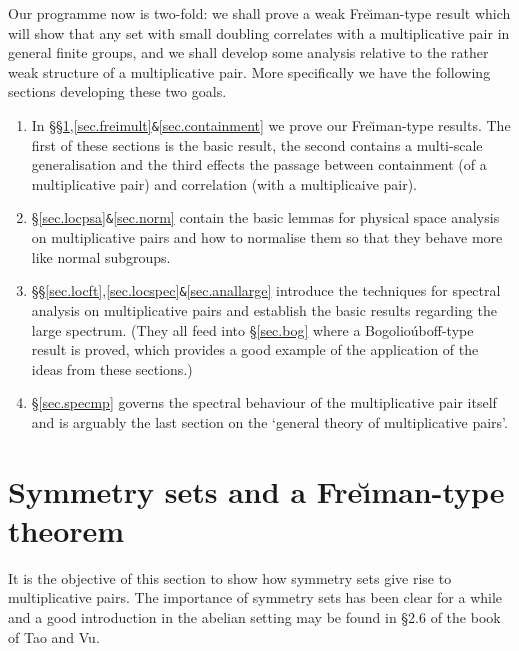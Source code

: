 \documentclass[12pt]{amsart}
\numberwithin{equation}{section}
\theoremstyle{plain}
\theoremstyle{definition}
\begin{document}
Our programme now is two-fold: we shall prove a weak Fre{\u\i}man-type result which will show that any set with small doubling correlates with a multiplicative pair in general finite groups, and we shall develop some analysis relative to the rather weak structure of a multiplicative pair.  More specifically we have the following sections developing these two goals.
\begin{enumerate}
\item In \S\S\ref{sec.frei},\ref{sec.freimult}\verb!&!\ref{sec.containment} we prove our Fre{\u\i}man-type results.  The first of these sections is the basic result, the second contains a multi-scale generalisation and the third effects the passage between containment (of a multiplicative pair) and correlation (with a multiplicaive pair).
\item \S\ref{sec.locpsa}\verb!&!\ref{sec.norm} contain the basic lemmas for physical space analysis on multiplicative pairs and how to normalise them so that they behave more like normal subgroups.
\item \S\S\ref{sec.locft},\ref{sec.locspec}\verb!&!\ref{sec.anallarge} introduce the techniques for spectral analysis on multiplicative pairs and establish the basic results regarding the large spectrum.  (They all feed into \S\ref{sec.bog} where a Bogolio{\'u}boff-type result is proved, which provides a good example of the application of the ideas from these sections.)
\item \S\ref{sec.specmp} governs the spectral behaviour of the multiplicative pair itself and is arguably the last section on the `general theory of multiplicative pairs'.
\end{enumerate}

\section{Symmetry sets and a Fre{\u\i}man-type theorem}\label{sec.frei}

It is the objective of this section to show how symmetry sets give rise to multiplicative pairs. The importance of symmetry sets has been clear for a while and a good introduction in the abelian setting may be found in \S2.6 of the book \cite{TCTVHV} of Tao and Vu.  
\end{document}
